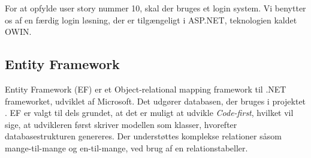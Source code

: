 For at opfylde user story nummer 10, skal der bruges et login system.
Vi benytter os af en færdig login løsning, der er tilgængeligt i ASP.NET, teknologien kaldet OWIN.

\subsection{Entity Framework}
Entity Framework (EF) er et Object-relational mapping framework til .NET frameworket, udviklet af Microsoft.
Det udgører databasen, der bruges i projektet \citep{EF}.
EF er valgt til dels grundet, at det er muligt at udvikle \textit{Code-first}, hvilket vil sige, at udvikleren først skriver modellen som klasser, hvorefter databasestrukturen genereres.
Der understøttes komplekse relationer såsom mange-til-mange og en-til-mange, ved brug af en relationstabeller.

